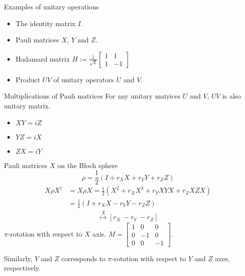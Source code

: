 \documentclass{beamer}
\newcommand\emm[1]{\textcolor{redorange}{{#1}}}
\begin{document}
\begin{frame}{Examples of unitary operations}
\begin{itemize}
\setlength{\itemsep}{2em}
\item The identity matrix $I$.
\item Pauli matrices $X$, $Y$ and $Z$.
\item Hadamard matrix $H:=\frac1{\sqrt{2}}\begin{bmatrix}1&1\\1&-1\end{bmatrix}$
\item Product $UV$ of unitary operators $U$ and $V$.
\end{itemize}
\end{frame}

\begin{frame}{Multiplications of Pauli matrices}
For any unitary matrices $U$ and $V$, $UV$ is also unitary matrix.

\vspace{2em}
\begin{itemize}
\setlength{\itemsep}{2em}
\item $XY=iZ$
\item $YZ=iX$
\item $ZX=iY$
\end{itemize}
\end{frame}

\begin{frame}{Pauli matrices $X$ on the Bloch sphere}
\begin{equation*}
\rho = \frac12\left(I + r_X X + r_Y Y + r_Z Z\right)
\end{equation*}
\begin{align*}
X\rho X^\dagger &= X\rho X =  \frac12\left(X^2 + r_X X^3 + r_Y XYX + r_Z XZX\right)\\
&=  \frac12\left(I + r_X X - r_Y Y - r_Z Z\right)
\end{align*}
\begin{align*}
[r_X\ r_Y\ r_Z]\overset{X}{\longmapsto} [r_X\ -r_Y\ -r_Z]
\end{align*}
\emm{$\pi$-rotation} with respect to $X$ axis.
$M = \begin{bmatrix}1&0&0\\0&-1&0\\0&0&-1\end{bmatrix}$.

\vspace{1em}
Similarly, $Y$ and $Z$ corresponds to \emm{$\pi$-rotation} with respect to $Y$ and $Z$ axes, respectively.
\end{frame}
\end{document}
